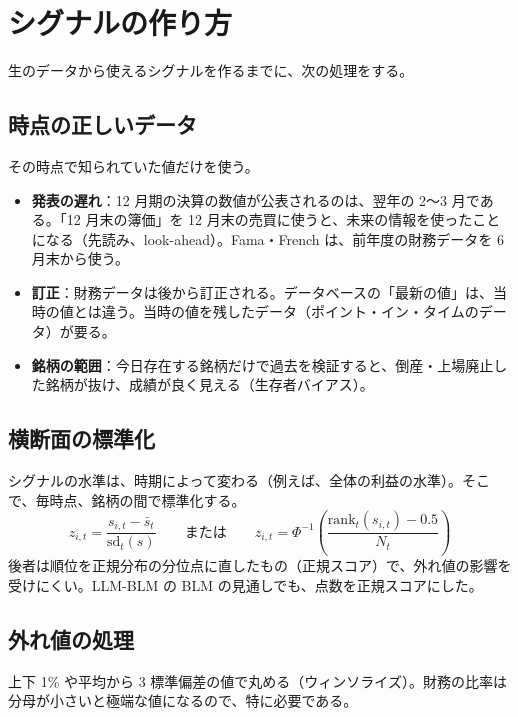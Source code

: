 \section{シグナルの作り方}

生のデータから使えるシグナルを作るまでに、次の処理をする。

\subsection{時点の正しいデータ}

その時点で知られていた値だけを使う。

\begin{itemize}
\item \textbf{発表の遅れ}：12 月期の決算の数値が公表されるのは、翌年の 2〜3 月である。「12 月末の簿価」を 12 月末の売買に使うと、未来の情報を使ったことになる（先読み、look-ahead）。Fama・French は、前年度の財務データを 6 月末から使う。
\item \textbf{訂正}：財務データは後から訂正される。データベースの「最新の値」は、当時の値とは違う。当時の値を残したデータ（ポイント・イン・タイムのデータ）が要る。
\item \textbf{銘柄の範囲}：今日存在する銘柄だけで過去を検証すると、倒産・上場廃止した銘柄が抜け、成績が良く見える（生存者バイアス）。
\end{itemize}

\subsection{横断面の標準化}

シグナルの水準は、時期によって変わる（例えば、全体の利益の水準）。そこで、毎時点、銘柄の間で標準化する。
\begin{equation}
z_{i,t} = \frac{s_{i,t} - \bar{s}_t}{\mathrm{sd}_t(s)} \qquad \text{または} \qquad
z_{i,t} = \Phi^{-1}\!\left(\frac{\mathrm{rank}_t(s_{i,t}) - 0.5}{N_t}\right)
\end{equation}
後者は順位を正規分布の分位点に直したもの（正規スコア）で、外れ値の影響を受けにくい。LLM-BLM の BLM の見通しでも、点数を正規スコアにした。

\subsection{外れ値の処理}

上下 1\% や平均から 3 標準偏差の値で丸める（ウィンソライズ）。財務の比率は分母が小さいと極端な値になるので、特に必要である。

